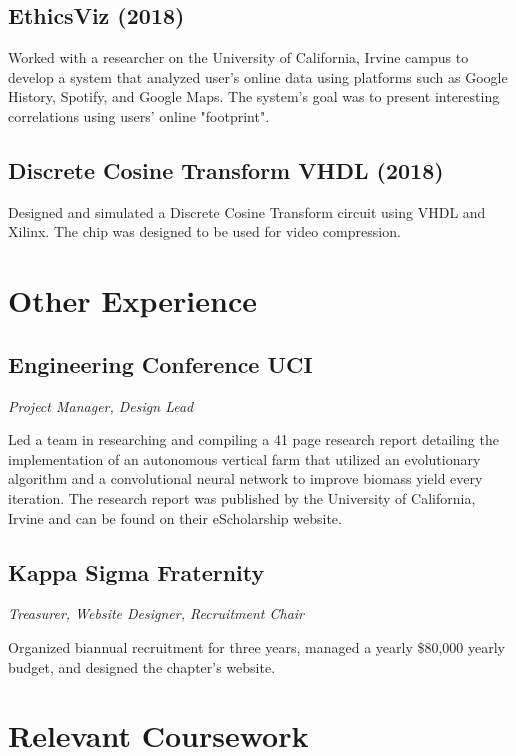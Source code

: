 \documentclass{article}
\begin{document}
\subsection{EthicsViz (2018)}

Worked with a researcher on the University of California, Irvine campus to develop a system that analyzed 
user's online data using platforms such as Google History, Spotify, and Google Maps. The system's goal was to present interesting correlations using users' online "footprint".  

\subsection{Discrete Cosine Transform VHDL (2018)}

Designed and simulated a Discrete Cosine Transform circuit using VHDL and Xilinx. The chip was designed to be 
used for video compression. 

\section{Other Experience}

\subsection{Engineering Conference UCI}

\noindent\textit{Project Manager, Design Lead}

Led a team in researching and compiling a 41 page research report detailing the implementation of an 
autonomous vertical farm that utilized an evolutionary algorithm and a convolutional neural network 
to improve biomass yield every iteration. The research report was published by the University of 
California, Irvine and can be found on their eScholarship website.

\subsection{Kappa Sigma Fraternity}

\noindent\textit{Treasurer, Website Designer, Recruitment Chair}

Organized biannual recruitment for three years, managed a yearly \$80,000 yearly budget, and designed 
the chapter's website.

\section{Relevant Coursework}
\end{document}
